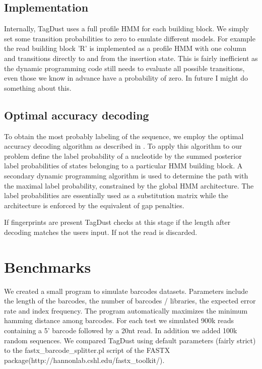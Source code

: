 \documentclass[11pt,a4paper,oneside]{book}
\begin{document}
\section{Implementation} 

Internally, TagDust uses a full profile HMM for each building block. We simply set some transition probabilities to zero to emulate different models. For example the read building block 'R' is implemented as a profile HMM with one column and transitions directly to and from the insertion state.
This is fairly inefficient as the dynamic programming code still needs to evaluate all possible transitions, even those we know in advance have a probability of zero. In future I might do something about this. 

\section{Optimal accuracy decoding} 

To obtain the most probably labeling of the sequence, we employ the optimal accuracy decoding algorithm as described in \citep{Kall:2005vg}. To apply this algorithm to our problem define the label probability of a nucleotide by the summed posterior label probabilities of states belonging to a particular HMM building block. A secondary dynamic programming algorithm is used to determine the path with the maximal label probability, constrained by the global HMM architecture. The label probabilities are essentially used as a substitution matrix while the architecture is enforced by the equivalent of gap penalties. 

If fingerprints are present TagDust checks at this stage if the length after decoding matches the users input. If not the read is discarded. 

\chapter{Benchmarks}

We created a small program to simulate barcodes datasets. Parameters include the length of the barcodes, the number of barcodes / libraries, the expected error rate and index frequency. The program automatically maximizes the minimum hamming distance among barcodes. For each test we simulated 900k reads containing a 5' barcode followed by a 20nt read. In addition we added 100k random sequences. 
We compared TagDust using default parameters (fairly strict) to the fastx\_barcode\_splitter.pl script of the FASTX package(http://hannonlab.cshl.edu/fastx\_toolkit/).  
\end{document}
